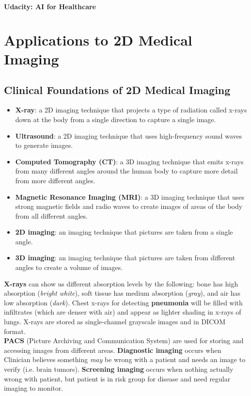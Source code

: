 \documentclass[11pt, a4paper]{article}
\begin{document}
	\begin{titlepage}
		\begin{center} \Huge \textbf{Udacity: AI for Healthcare} \end{center}
		\tableofcontents
		\newpage
	\end{titlepage}
	
	
	\section{Applications to 2D Medical Imaging}
	\subsection{Clinical Foundations of 2D Medical Imaging}
	\begin{itemize}
		\item \textbf{X-ray}: a 2D imaging technique that projects a type of radiation called x-rays down at the body from a single direction to capture a single image.
		\item \textbf{Ultrasound}: a 2D imaging technique that uses high-frequency sound waves to generate images.
		\item \textbf{Computed Tomography (CT)}: a 3D imaging technique that emits x-rays from many different angles around the human body to capture more detail from more different angles.
		\item \textbf{Magnetic Resonance Imaging (MRI)}: a 3D imaging technique that uses strong magnetic fields and radio waves to create images of areas of the body from all different angles.
		\item \textbf{2D imaging}: an imaging technique that pictures are taken from a single angle.
		\item \textbf{3D imaging}: an imaging technique that pictures are taken from different angles to create a volume of images.
	\end{itemize}
	\textbf{X-rays} can show us different absorption levels by the following: bone has high absorption (\textit{bright white}), soft tissue has medium absorption (\textit{gray}), and air has low absorption (\textit{dark}). Chest x-rays for detecting \textbf{pneumonia} will be filled with infiltrates (which are denser with air) and appear as lighter shading in x-rays of lungs. X-rays are stored as single-channel grayscale images and in DICOM format. \vspace*{3mm}\\
	\textbf{PACS} (Picture Archiving and Communication System) are used for storing and accessing images from different areas. \textbf{Diagnostic imaging} occurs when Clinician believes something \textit{may} be wrong with a patient and needs an image to verify (i.e. brain tumors). \textbf{Screening imaging} occurs when nothing actually wrong with patient, but patient is in risk group for disease and need regular imaging to monitor.\vspace*{2mm}\\
\end{document}
